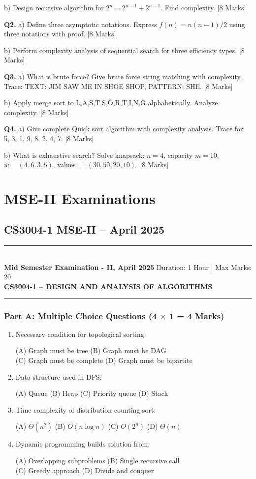 \documentclass[11pt,a4paper]{article}
\newcommand{\examheader}[4]{
\noindent\rule{\textwidth}{0.5pt}\\
\textbf{#1} \hfill Duration: #3 | Max Marks: #4\\
\textbf{#2}\\
\rule{\textwidth}{0.5pt}
\vspace{0.2cm}
}
\begin{document}
b) Design recursive algorithm for $2^n = 2^{n-1} + 2^{n-1}$. Find complexity. \hfill [8 Marks]

\textbf{Q2.} a) Define three asymptotic notations. Express $f(n) = n(n-1)/2$ using three notations with proof. \hfill [8 Marks]

b) Perform complexity analysis of sequential search for three efficiency types. \hfill [8 Marks]

\textbf{Q3.} a) What is brute force? Give brute force string matching with complexity. Trace: TEXT: JIM SAW ME IN SHOE SHOP, PATTERN: SHE. \hfill [8 Marks]

b) Apply merge sort to L,A,S,T,S,O,R,T,I,N,G alphabetically. Analyze complexity. \hfill [8 Marks]

\textbf{Q4.} a) Give complete Quick sort algorithm with complexity analysis. Trace for: 5, 3, 1, 9, 8, 2, 4, 7. \hfill [8 Marks]

b) What is exhaustive search? Solve knapsack: $n=4$, capacity $m=10$, $w=(4,6,3,5)$, values $=(30,50,20,10)$. \hfill [8 Marks]

\section{MSE-II Examinations}

\subsection{CS3004-1 MSE-II -- April 2025}
\examheader{Mid Semester Examination - II, April 2025}{CS3004-1 -- DESIGN AND ANALYSIS OF ALGORITHMS}{1 Hour}{20}

\subsubsection*{Part A: Multiple Choice Questions (4 $\times$ 1 = 4 Marks)}

\begin{enumerate}
\item Necessary condition for topological sorting:

(A) Graph must be tree \quad (B) Graph must be DAG\\
(C) Graph must be complete \quad (D) Graph must be bipartite

\item Data structure used in DFS:

(A) Queue \quad (B) Heap \quad (C) Priority queue \quad (D) Stack

\item Time complexity of distribution counting sort:

(A) $\Theta(n^2)$ \quad (B) $O(n \log n)$ \quad (C) $O(2^n)$ \quad (D) $\Theta(n)$

\item Dynamic programming builds solution from:

(A) Overlapping subproblems \quad (B) Single recursive call\\
(C) Greedy approach \quad (D) Divide and conquer
\end{enumerate}
\end{document}
